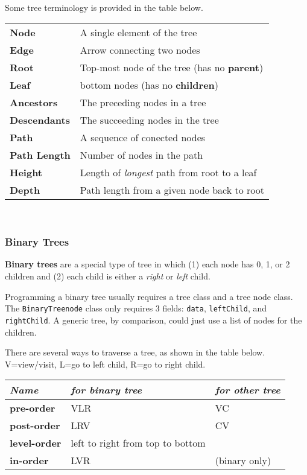 Some tree terminology is provided in the table below. \\


\begin{tabular}{p{}p{}}
\textbf{Node} & A single element of the tree \\
\textbf{Edge} & Arrow connecting two nodes \\
\textbf{Root} & Top-most node of the tree (has no \textbf{parent}) \\
\textbf{Leaf} & bottom nodes (has no \textbf{children}) \\
\textbf{Ancestors} & The preceding nodes in a tree \\
\textbf{Descendants} & The succeeding nodes in the tree \\
\textbf{Path} & A sequence of conected nodes \\
\textbf{Path Length} & Number of nodes in the path \\
\textbf{Height} & Length of \textit{longest} path from root to a leaf \\
\textbf{Depth} & Path length from a given node back to root \\
\end{tabular} \\

\subsubsection{Binary Trees}

\textbf{Binary trees} are a special type of tree in which (1) each node has 0, 1, or 2 children and (2) each child is either a \textit{right} or \textit{left} child. 

Programming a binary tree usually requires a tree class and a tree node class. The \texttt{BinaryTreenode} class only requires 3 fields: \texttt{data}, \texttt{leftChild}, and \texttt{rightChild}. A generic tree, by comparison, could just use a list of nodes for the children. 

There are several ways to traverse a tree, as shown in the table below. V=view/visit, L=go to left child, R=go to right child. \\

\begin{tabular}{p{}p{}p{}}
\textit{Name} & \textit{for binary tree} & \textit{for other tree} \\
\hline
\textbf{pre-order} & VLR & VC \\
\textbf{post-order} & LRV & CV \\
\textbf{level-order} & left to right from top to bottom \\
\textbf{in-order} & LVR & (binary only) \\
\end{tabular} \\

